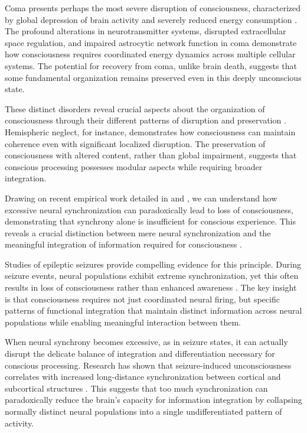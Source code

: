 \begin{refsection}
Coma presents perhaps the most severe disruption of consciousness, characterized by global depression of brain activity and severely reduced energy consumption \cite{Adams2000}. The profound alterations in neurotransmitter systems, disrupted extracellular space regulation, and impaired astrocytic network function in coma demonstrate how consciousness requires coordinated energy dynamics across multiple cellular systems. The potential for recovery from coma, unlike brain death, suggests that some fundamental organization remains preserved even in this deeply unconscious state.

These distinct disorders reveal crucial aspects about the organization of consciousness through their different patterns of disruption and preservation \cite{Monti2010}. Hemispheric neglect, for instance, demonstrates how consciousness can maintain coherence even with significant localized disruption. The preservation of consciousness with altered content, rather than global impairment, suggests that conscious processing possesses modular aspects while requiring broader integration.

Drawing on recent empirical work detailed in \cite{LeVanQuyen2007} and \cite{Bartolomei2009}, we can understand how excessive neural synchronization can paradoxically lead to loss of consciousness, demonstrating that synchrony alone is insufficient for conscious experience. This reveals a crucial distinction between mere neural synchronization and the meaningful integration of information required for consciousness \cite{Koch2016,Tononi2015}.

Studies of epileptic seizures provide compelling evidence for this principle. During seizure events, neural populations exhibit extreme synchronization, yet this often results in loss of consciousness rather than enhanced awareness \cite{Bartolomei2009}. The key insight is that consciousness requires not just coordinated neural firing, but specific patterns of functional integration that maintain distinct information across neural populations while enabling meaningful interaction between them.

When neural synchrony becomes excessive, as in seizure states, it can actually disrupt the delicate balance of integration and differentiation necessary for conscious processing. Research has shown that seizure-induced unconsciousness correlates with increased long-distance synchronization between cortical and subcortical structures \cite{Bartolomei2009}. This suggests that too much synchronization can paradoxically reduce the brain's capacity for information integration by collapsing normally distinct neural populations into a single undifferentiated pattern of activity.


\end{refsection}
